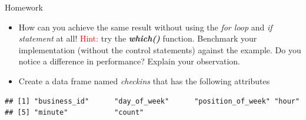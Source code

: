 \documentclass[12pt]{book}\usepackage{knitr}
\begin{document}
\begin{DIY}{Homework}
 \begin{itemize}
  \item \noindent How can you achieve the same result without using the \emph{for loop} and \emph{if statement} at all! \textcolor{red}{Hint:} try the \textbf{\emph{which()}} function. Benchmark your implementation (without the control statements) against the example. Do you notice a difference in performance? Explain your observation.
  \item \noindent Create a data frame named \emph{checkins} that has the following attributes
\end{itemize}
\end{DIY}

\begin{knitrout}
\color{fgcolor}\begin{kframe}
\begin{alltt}
\end{alltt}
\begin{verbatim}
## [1] "business_id"      "day_of_week"      "position_of_week" "hour"            
## [5] "minute"           "count"
\end{verbatim}
\end{kframe}
\end{knitrout}
\end{document}

